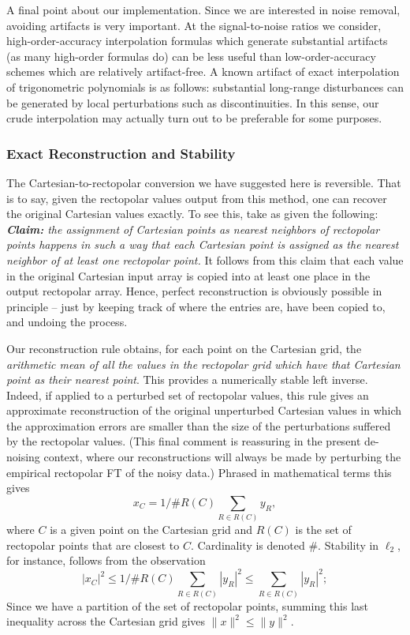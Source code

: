 A final point about our implementation. Since we are
interested in noise removal, avoiding 
artifacts is very important.  At the  signal-to-noise ratios we
consider, high-order-accuracy interpolation formulas which  generate
substantial artifacts  (as many high-order formulas do) can be less
useful than  low-order-accuracy schemes which are relatively
artifact-free. A known artifact of exact interpolation of trigonometric
polynomials is as follows: substantial long-range disturbances can be
generated by local perturbations such as discontinuities. In this
sense, our crude interpolation may actually turn out to be preferable
for some purposes.

\subsubsection{Exact Reconstruction and Stability}

The Cartesian-to-rectopolar conversion we have suggested here
is reversible. That is to say, given the rectopolar values output from
this method, one can recover the original Cartesian values exactly.
To see this, take as given the following: {\it {\bf Claim:} the assignment
of Cartesian points as nearest neighbors of rectopolar points happens
in such a way that   each Cartesian point is assigned as the nearest
neighbor of at least one rectopolar point.}  It follows from this claim
that each value in the original Cartesian input array is copied into at
least one place in the output rectopolar array. Hence, perfect
reconstruction is obviously possible in principle -- just by keeping track
of where the entries are, have been copied to, and undoing the process.

Our reconstruction rule obtains, for each point on the Cartesian grid,
the {\it arithmetic mean of all the values in the rectopolar grid
  which have that Cartesian point as their nearest point}. This
provides a numerically stable left inverse.  Indeed, if applied to a
perturbed set of rectopolar values, this rule gives an approximate
reconstruction of the original unperturbed Cartesian values in which
the approximation errors are smaller than the size of the
perturbations suffered by the rectopolar values. (This final comment
is reassuring in the present de-noising context, where our
reconstructions will always be made by perturbing the empirical
rectopolar FT of the noisy data.) Phrased in mathematical terms
this gives
\[
x_C = 1/\# R(C) \sum_{R \in R(C)} y_R, 
\]
where $C$ is a given point on the Cartesian grid and $R(C)$ is the set
of rectopolar points that are closest to $C$. Cardinality is denoted
$\#$. Stability in $\ell_2$,
for instance, follows from the observation
\[
|x_C|^2 \le 1/\# R(C) \sum_{R \in R(C)} |y_R|^2 
\le \sum_{R \in R(C)} |y_R|^2; 
\]
Since we have a partition of the set of rectopolar points,
summing this last inequality across the Cartesian grid gives $\|x\|^2
\le \|y\|^2$.

